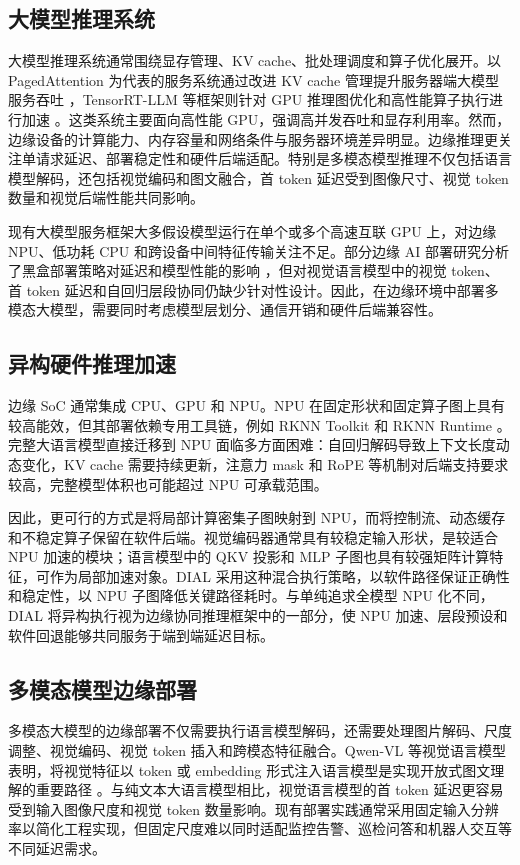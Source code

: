 \documentclass[10pt,a4paper,twocolumn]{ctexart}
\begin{document}
\subsection{大模型推理系统}

大模型推理系统通常围绕显存管理、KV cache、批处理调度和算子优化展开。以 PagedAttention 为代表的服务系统通过改进 KV cache 管理提升服务器端大模型服务吞吐 \cite{ref5}，TensorRT-LLM 等框架则针对 GPU 推理图优化和高性能算子执行进行加速 \cite{ref6}。这类系统主要面向高性能 GPU，强调高并发吞吐和显存利用率。然而，边缘设备的计算能力、内存容量和网络条件与服务器环境差异明显。边缘推理更关注单请求延迟、部署稳定性和硬件后端适配。特别是多模态模型推理不仅包括语言模型解码，还包括视觉编码和图文融合，首 token 延迟受到图像尺寸、视觉 token 数量和视觉后端性能共同影响。

现有大模型服务框架大多假设模型运行在单个或多个高速互联 GPU 上，对边缘 NPU、低功耗 CPU 和跨设备中间特征传输关注不足。部分边缘 AI 部署研究分析了黑盒部署策略对延迟和模型性能的影响 \cite{ref4}，但对视觉语言模型中的视觉 token、首 token 延迟和自回归层段协同仍缺少针对性设计。因此，在边缘环境中部署多模态大模型，需要同时考虑模型层划分、通信开销和硬件后端兼容性。

\subsection{异构硬件推理加速}

边缘 SoC 通常集成 CPU、GPU 和 NPU。NPU 在固定形状和固定算子图上具有较高能效，但其部署依赖专用工具链，例如 RKNN Toolkit 和 RKNN Runtime \cite{ref8}。完整大语言模型直接迁移到 NPU 面临多方面困难：自回归解码导致上下文长度动态变化，KV cache 需要持续更新，注意力 mask 和 RoPE 等机制对后端支持要求较高，完整模型体积也可能超过 NPU 可承载范围。

因此，更可行的方式是将局部计算密集子图映射到 NPU，而将控制流、动态缓存和不稳定算子保留在软件后端。视觉编码器通常具有较稳定输入形状，是较适合 NPU 加速的模块；语言模型中的 QKV 投影和 MLP 子图也具有较强矩阵计算特征，可作为局部加速对象。DIAL 采用这种混合执行策略，以软件路径保证正确性和稳定性，以 NPU 子图降低关键路径耗时。与单纯追求全模型 NPU 化不同，DIAL 将异构执行视为边缘协同推理框架中的一部分，使 NPU 加速、层段预设和软件回退能够共同服务于端到端延迟目标。

\subsection{多模态模型边缘部署}

多模态大模型的边缘部署不仅需要执行语言模型解码，还需要处理图片解码、尺度调整、视觉编码、视觉 token 插入和跨模态特征融合。Qwen-VL 等视觉语言模型表明，将视觉特征以 token 或 embedding 形式注入语言模型是实现开放式图文理解的重要路径 \cite{ref7}。与纯文本大语言模型相比，视觉语言模型的首 token 延迟更容易受到输入图像尺度和视觉 token 数量影响。现有部署实践通常采用固定输入分辨率以简化工程实现，但固定尺度难以同时适配监控告警、巡检问答和机器人交互等不同延迟需求。
\end{document}
